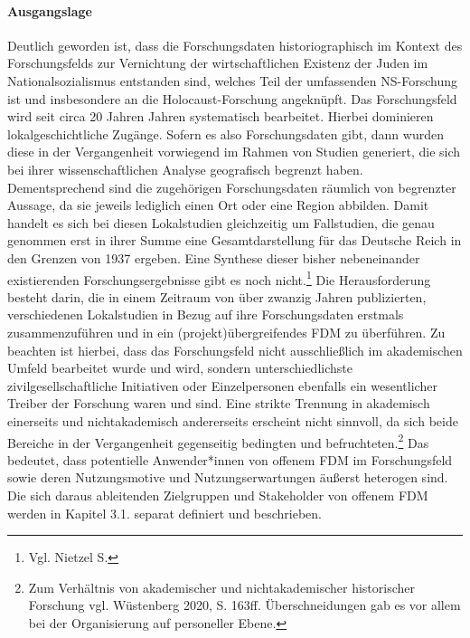 \paragraph{Ausgangslage} Deutlich geworden ist, dass die Forschungsdaten historiographisch im  Kontext des Forschungsfelds zur Vernichtung der wirtschaftlichen Existenz der Juden im Nationalsozialismus entstanden sind, welches Teil der umfassenden NS-Forschung ist und insbesondere an die Holocaust-Forschung angeknüpft. Das Forschungsfeld wird seit circa 20 Jahren Jahren systematisch bearbeitet. Hierbei dominieren lokalgeschichtliche Zugänge. Sofern es also Forschungsdaten gibt, dann wurden diese in der Vergangenheit vorwiegend im Rahmen von Studien generiert, die sich bei ihrer wissenschaftlichen Analyse geografisch begrenzt haben. Dementsprechend sind die zugehörigen Forschungsdaten räumlich von begrenzter Aussage, da sie jeweils lediglich einen Ort oder eine Region abbilden. Damit handelt es sich bei diesen Lokalstudien gleichzeitig um Fallstudien, die genau genommen erst in ihrer Summe eine Gesamtdarstellung für das Deutsche Reich in den Grenzen von 1937 ergeben. Eine Synthese dieser bisher nebeneinander existierenden Forschungsergebnisse gibt es noch nicht.\footnote{Vgl. Nietzel S.} Die Herausforderung besteht darin, die in einem Zeitraum von über zwanzig Jahren publizierten, verschiedenen Lokalstudien in Bezug auf ihre Forschungsdaten erstmals zusammenzuführen und in ein (projekt)übergreifendes FDM zu überführen. Zu beachten ist hierbei, dass das Forschungsfeld nicht ausschließlich im akademischen Umfeld bearbeitet wurde und wird, sondern unterschiedlichste zivilgesellschaftliche Initiativen oder Einzelpersonen ebenfalls ein wesentlicher Treiber der Forschung waren und sind. Eine strikte Trennung in akademisch einerseits und nichtakademisch andererseits erscheint nicht sinnvoll, da sich beide Bereiche in der Vergangenheit gegenseitig bedingten und befruchteten.\footnote{Zum Verhältnis von akademischer und nichtakademischer historischer Forschung vgl. Wüstenberg 2020, S. 163ff. Überschneidungen gab es vor allem bei der Organisierung  auf personeller Ebene.} Das bedeutet, dass potentielle Anwender*innen von offenem FDM im Forschungsfeld sowie deren Nutzungsmotive und Nutzungserwartungen äußerst heterogen sind. Die sich daraus ableitenden Zielgruppen und Stakeholder von offenem FDM werden in Kapitel 3.1. separat definiert und beschrieben.

